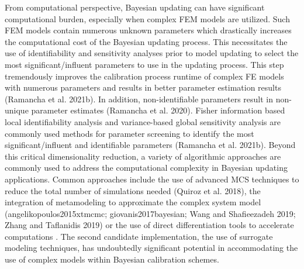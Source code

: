 From computational perspective, Bayesian updating can have significant computational burden, especially when complex FEM models are utilized. Such FEM models contain numerous unknown parameters which drastically increases the computational cost of the Bayesian updating process. This necessitates the use of identifiability and sensitivity analyses prior to model updating to select the most significant/influent parameters to use in the updating process. This step tremendously improves the calibration process runtime of complex FE models with numerous parameters and results in better parameter estimation results (Ramancha et al. 2021b). In addition, non-identifiable parameters result in non-unique parameter estimates (Ramancha et al. 2020). Fisher information based local identifiability analysis and variance-based global sensitivity analysis are commonly used methods for parameter screening to identify the most significant/influent and identifiable parameters (Ramancha et al. 2021b). Beyond this critical dimensionality reduction, a variety of algorithmic approaches are commonly used to address the computational complexity in Bayesian updating applications. Common approaches include the use of advanced MCS techniques to reduce the total number of simulations needed (Quiroz et al. 2018), the integration of metamodeling to approximate the complex system model (angelikopoulos2015xtmcmc; giovanis2017bayesian; Wang and Shafieezadeh 2019; Zhang and Taflanidis 2019) or the use of direct differentiation tools to accelerate computations \citep{astroza2017batch}. The second candidate implementation, the use of surrogate modeling techniques, has undoubtedly significant potential in accommodating the use of complex models within Bayesian calibration schemes.     

